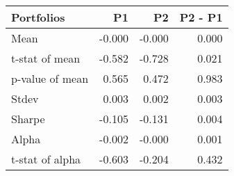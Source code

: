 \begin{tabular}{lrrr}
\toprule
Portfolios & P1 & P2 & P2 - P1 \\
\midrule
Mean & -0.000 & -0.000 & 0.000 \\
t-stat of mean & -0.582 & -0.728 & 0.021 \\
p-value of mean & 0.565 & 0.472 & 0.983 \\
Stdev & 0.003 & 0.002 & 0.003 \\
Sharpe & -0.105 & -0.131 & 0.004 \\
Alpha & -0.002 & -0.000 & 0.001 \\
t-stat of alpha & -0.603 & -0.204 & 0.432 \\
\bottomrule
\end{tabular}
